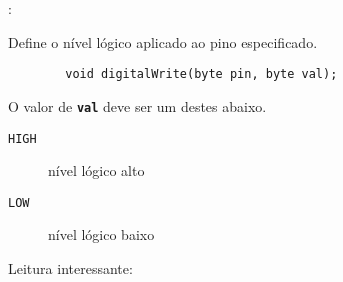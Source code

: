 \begin{frame}[b,fragile]{\insertsection: \insertsubsection}

	Define o nível lógico aplicado ao pino especificado.
	\begin{verbatim}
		void digitalWrite(byte pin, byte val);
	\end{verbatim}

	O valor de \texttt{\textbf{val}} deve ser um destes abaixo.
	\begin{description}
		\item[\texttt{HIGH}] nível lógico alto
		\item[\texttt{LOW}] nível lógico baixo
	\end{description}

	\vfill
	Leitura interessante: 

\end{frame}
